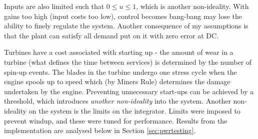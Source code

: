 Inputs are also limited such that $ 0 \leq u \leq 1$, which is another non-ideality.
With gains too high (input costs too low), control becomes bang-bang may lose the ability to finely regulate the system.
Another consequence of my assumptions is that the plant can satisfy all demand put on it with zero error at DC.

Turbines have a cost associated with starting up - the amount of wear in a turbine (what defines the time between services) is determined by the number of spin-up events.
The blades in the turbine undergo one stress cycle when the engine spools up to speed which (by Miners Rule) determines the damage undertaken by the engine.
Preventing unnecessary start-ups can be achieved by a threshold, which introduces \emph{another non-ideality} into the system.
Another non-ideality on the system is the limits on the integrator.
Limits were imposed to prevent windup, and these were tuned for performance.
Results from the implementation are analysed below in Section \ref{sec:pwrtesting}.
